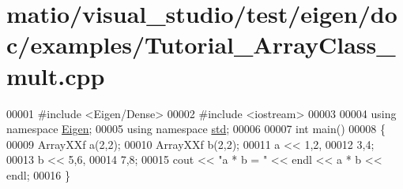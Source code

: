 \hypertarget{matio_2visual__studio_2test_2eigen_2doc_2examples_2_tutorial___array_class__mult_8cpp_source}{}\section{matio/visual\+\_\+studio/test/eigen/doc/examples/\+Tutorial\+\_\+\+Array\+Class\+\_\+mult.cpp}
\label{matio_2visual__studio_2test_2eigen_2doc_2examples_2_tutorial___array_class__mult_8cpp_source}

\begin{DoxyCode}
00001 \textcolor{preprocessor}{#include <Eigen/Dense>}
00002 \textcolor{preprocessor}{#include <iostream>}
00003 
00004 \textcolor{keyword}{using namespace }\hyperlink{namespace_eigen}{Eigen};
00005 \textcolor{keyword}{using namespace }\hyperlink{namespacestd}{std};
00006 
00007 \textcolor{keywordtype}{int} main()
00008 \{
00009   ArrayXXf a(2,2);
00010   ArrayXXf b(2,2);
00011   a << 1,2,
00012        3,4;
00013   b << 5,6,
00014        7,8;
00015   cout << \textcolor{stringliteral}{"a * b = "} << endl << a * b << endl;
00016 \}
\end{DoxyCode}
